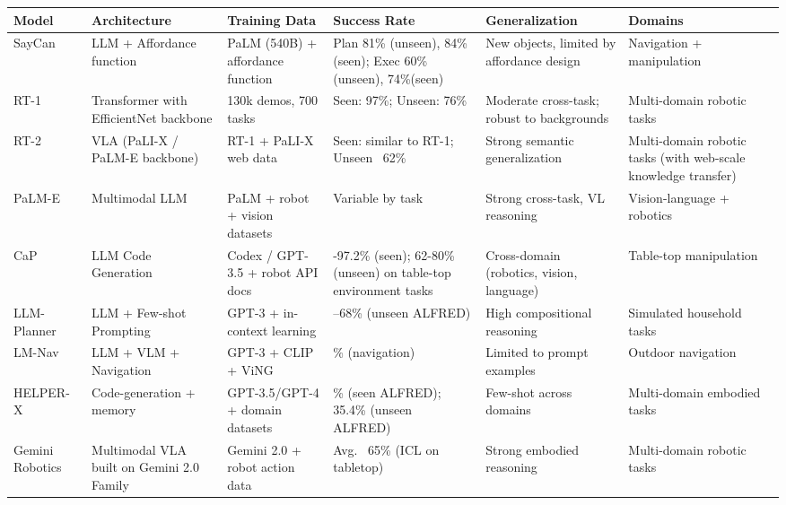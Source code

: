 \documentclass[11pt]{article}
\begin{document}
\setlength{\tabcolsep}{3pt}
\renewcommand{\arraystretch}{1.05}

\begin{table}[ht]
\centering
\footnotesize
\begin{tabular}{
    |>{\raggedright\arraybackslash}p{1.8cm}
    |>{\raggedright\arraybackslash}p{2.2cm}
    |>{\raggedright\arraybackslash}p{3.2cm}
    |>{\raggedright\arraybackslash}p{2.2cm}
    |>{\raggedright\arraybackslash}p{3.0cm}
    |>{\raggedright\arraybackslash}p{2.3cm}|
}
\hline
\textbf{Model} & \textbf{Architecture} & \textbf{Training Data} & \textbf{Success Rate} & \textbf{Generalization} & \textbf{Domains} \\
\hline
SayCan & LLM + Affordance function & PaLM (540B) + affordance function & Plan  81\% (unseen),  84\% (seen); Exec 60\% (unseen), 74\%(seen) & New objects, limited by affordance design & Navigation + manipulation \\
\hline
RT-1 & Transformer with EfficientNet backbone & 130k demos, 700 tasks & Seen: 97\%; Unseen: 76\% & Moderate cross-task; robust to backgrounds & Multi-domain robotic tasks \\
\hline
RT-2 & VLA (PaLI-X / PaLM-E backbone) & RT-1 + PaLI-X web data & Seen: similar to RT-1; Unseen ~62\% & Strong semantic generalization & Multi-domain robotic tasks (with web-scale knowledge transfer)\\
\hline
PaLM-E & Multimodal LLM & PaLM + robot + vision datasets & Variable by task & Strong cross-task, VL reasoning & Vision-language + robotics \\
\hline
CaP & LLM Code Generation & Codex / GPT-3.5 + robot API docs & 89.3-97.2\% (seen); 62-80\% (unseen) on table-top environment tasks  & Cross-domain (robotics, vision, language) & Table-top manipulation \\
\hline
LLM-Planner & LLM + Few-shot Prompting & GPT-3 + in-context learning & 46–68\% (unseen ALFRED) & High compositional reasoning & Simulated household tasks \\
\hline
LM-Nav & LLM + VLM + Navigation & GPT-3 + CLIP + ViNG & 80\% (navigation) & Limited to prompt examples & Outdoor navigation \\
\hline
HELPER-X & Code-generation + memory & GPT-3.5/GPT-4 + domain datasets & 28.2\% (seen ALFRED); 35.4\% (unseen ALFRED) & Few-shot across domains & Multi-domain embodied tasks \\
\hline
Gemini Robotics & Multimodal VLA built on Gemini 2.0 Family & Gemini 2.0 + robot action data & Avg. ~65\% (ICL on tabletop) & Strong embodied reasoning & Multi-domain robotic tasks \\

\end{tabular}
\end{table}
\end{document}
